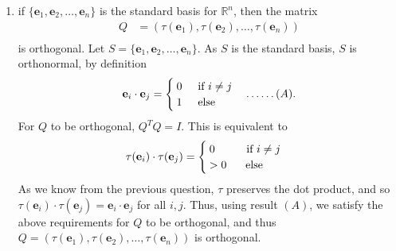 \documentclass[a4paper,11pt]{article}
\newcommand{\ds}{\displaystyle}
\begin{document}
{{\begin{enumerate}[leftmargin=*]
\begin{enumerate}
			\item if $\ds{\{\mathbf{e}_1, \mathbf{e}_2, \dots , \mathbf{e}_n\}}$ is the standard basis for $\ds{\mathbb{R}^n}$, then the matrix	
				\begin{align*}
					Q & = (\tau(\mathbf{e}_1), \tau(\mathbf{e}_2), \dots , \tau(\mathbf{e}_n))\\
				\end{align*}
				is orthogonal.
				\bigbreak
				Let $\ds{S = \{\mathbf{e}_1, \mathbf{e}_2, \dots , \mathbf{e}_n\}}$. As $\ds{S}$ is the standard basis, $\ds{S}$ is orthonormal, by definition 
				\begin{align*}
					\mathbf{e}_i \cdot \mathbf{e}_j & = 
					\begin{cases}
						\: 0 \hspace{5mm} \text{if } i \neq j\\
						\: 1 \hspace{5mm} \text{else}\\
					\end{cases} \dots\dots (A).\\
				\end{align*}
				For $\ds{Q}$ to be orthogonal, $\ds{Q^TQ = I}$. This is equivalent to 
				\begin{align*}
					\tau(\mathbf{e}_i) \cdot \tau(\mathbf{e}_j) & = 
					\begin{cases}
						\: 0 \hspace{10mm} \text{if } i \neq j\\
						\: > 0 \hspace{6mm} \text{else}\\
					\end{cases}\\
				\end{align*}
				As we know from the previous question, $\ds{\tau}$ preserves the dot product, and so\\$\ds{\tau(\mathbf{e}_i) \cdot \tau(\mathbf{e}_j) =	\mathbf{e}_i \cdot \mathbf{e}_j}$ for all $\ds{i,j}$. Thus, using result $\ds{(A)}$, we satisfy the above requirements for $\ds{Q}$ to be orthogonal, and thus $\ds{Q = (\tau(\mathbf{e}_1), \tau(\mathbf{e}_2), \dots , \tau(\mathbf{e}_n))}$ is orthogonal.


\end{enumerate}
\end{enumerate}}}
\end{document}
